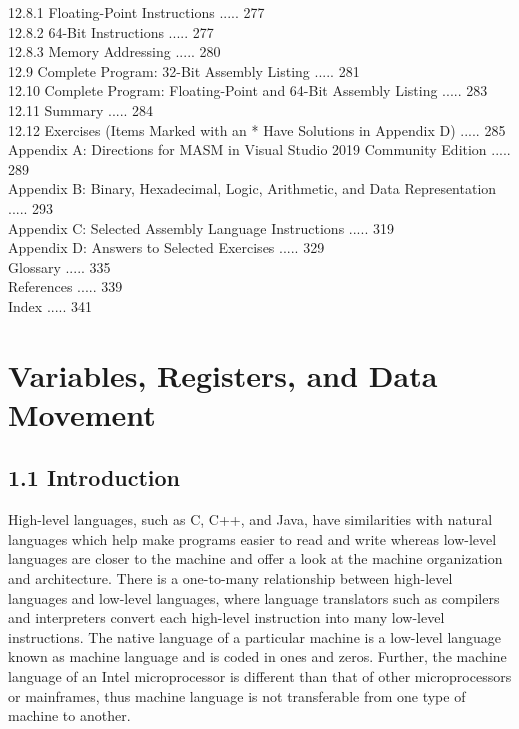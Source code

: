 \documentclass[10pt]{book}
\begin{document}
12.8.1 Floating-Point Instructions ..... 277\\
12.8.2 64-Bit Instructions ..... 277\\
12.8.3 Memory Addressing ..... 280\\
12.9 Complete Program: 32-Bit Assembly Listing ..... 281\\
12.10 Complete Program: Floating-Point and 64-Bit Assembly Listing ..... 283\\
12.11 Summary ..... 284\\
12.12 Exercises (Items Marked with an * Have Solutions in Appendix D) ..... 285\\

Appendix A: Directions for MASM in Visual Studio 2019 Community Edition ..... 289\\
Appendix B: Binary, Hexadecimal, Logic, Arithmetic, and Data Representation ..... 293\\
Appendix C: Selected Assembly Language Instructions ..... 319\\
Appendix D: Answers to Selected Exercises ..... 329\\
Glossary ..... 335\\
References ..... 339\\
Index ..... 341

\section*{Variables, Registers, and Data Movement }
\subsection*{1.1 Introduction}
High-level languages, such as C, C++, and Java, have similarities with natural languages which help make programs easier to read and write whereas low-level languages are closer to the machine and offer a look at the machine organization and architecture. There is a one-to-many relationship between high-level languages and low-level languages, where language translators such as compilers and interpreters convert each high-level instruction into many low-level instructions. The native language of a particular machine is a low-level language known as machine language and is coded in ones and zeros. Further, the machine language of an Intel microprocessor is different than that of other microprocessors or mainframes, thus machine language is not transferable from one type of machine to another.
\end{document}
